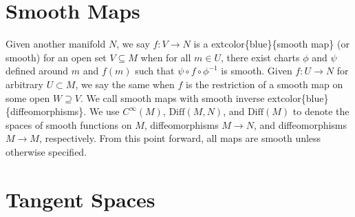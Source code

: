 \documentclass[
]{book}
\begin{document}
\hypertarget{smooth-maps}{%
\section{Smooth Maps}\label{smooth-maps}}

Given another manifold \(N\), we say \(f : V \to N\) is a extcolor\{blue\}\{smooth map\} (or smooth) for an open set \(V \subseteq M\) when for all \(m \in U\), there exist charts \(\phi\) and \(\psi\) defined around \(m\) and \(f(m)\) such that \(\psi \circ f \circ \phi^{-1}\) is smooth.
Given \(f : U \to N\) for arbitrary \(U \subset M\), we say the same when \(f\) is the restriction of a smooth map on some open \(W \supseteq V\).
We call smooth maps with smooth inverse extcolor\{blue\}\{diffeomorphisms\}.
We use \(C^\infty(M)\), \(\text{Diff}(M,N)\), and \(\text{Diff}(M)\) to denote the spaces of smooth functions on \(M\), diffeomorphisms \(M \to N\), and diffeomorphisms \(M \to M\), respectively.
From this point forward, all maps are smooth unless otherwise specified.

\hypertarget{tangent-spaces}{%
\section{Tangent Spaces}\label{tangent-spaces}}
\end{document}
